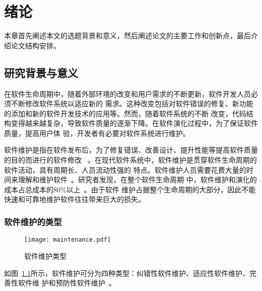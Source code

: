 
\chapter{绪论}
\label{chpt:introduction}
本章首先阐述本文的选题背景和意义，然后阐述论文的主要工作和创新点，最后介绍论文结构安排。

\section{研究背景与意义}
在软件生命周期中，随着外部环境的改变和用户需求的不断更新，软件开发人员必须不断修改软件系统以适应新的
需求。这种改变包括对软件错误的修复、新功能的添加和新的软件开发技术的应用等。然而，随着软件系统的不断
改变，代码结构变得越来越复杂，导致软件质量的逐渐下降。在软件演化过程中，为了保证软件质量，提高用户体
验，开发者有必要对软件系统进行维护。

软件维护是指在软件发布后，为了修复错误、改善设计、提升性能等提高软件质量的目的而进行的软件修改
~\cite{IEEE1219}。在现代软件系统中，软件维护是贯穿软件生命周期的软件活动，具有周期长、人员流动性强的
特点。软件维护人员需要花费大量的时间来理解和维护软件~\cite{Bansiya2002}。研究者发现，在整个软件生命周期
中，软件维护和演化的成本占总成本的80\%以上~\cite{guimaraes1983managing, coleman1994using}。由于软件
维护占据整个生命周期的大部分，因此不能快速和可靠地维护软件往往带来巨大的损失。

\subsection{软件维护的类型}

\begin{figure}
  \centering
  \texttt{[image: maintenance.pdf]}  
  \caption{\label{fig:maintenance}软件维护类型}
\end{figure}

如图~\ref{fig:maintenance}所示，软件维护可分为四种类型：纠错性软件维护、适应性软件维护、完善性软件维
护和预防性软件维护~\cite{lientz1978characteristics}。


